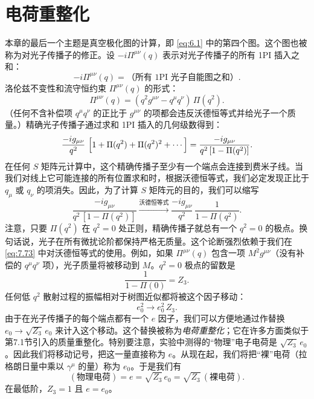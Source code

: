 \section{电荷重整化}

本章的最后一个主题是真空极化图的计算，即 \eqref{eq:6.1} 中的第四个图。这个图也被称为对光子传播子的修正。设 $-i\Pi^{\mu\nu}(q)$ 表示对光子传播子的所有 1PI 插入之和：
\begin{equation}
  -i\Pi^{\mu\nu}(q) = \text{（所有 1PI 光子自能图之和）} .
  \label{eq:7.71}
\end{equation}
洛伦兹不变性和流守恒约束 $\Pi^{\mu\nu}(q)$ 的形式：
\begin{equation}
  \Pi^{\mu\nu}(q) = (q^2g^{\mu\nu} - q^\mu q^\nu)\,\Pi(q^2) .
  \label{eq:7.72}
\end{equation}
（任何不含补偿项 $q^\mu q^\nu$ 的正比于 $g^{\mu\nu}$ 的项都会违反沃德恒等式并给光子一个质量。）精确光子传播子通过求和 1PI 插入的几何级数得到：
\begin{equation}
  \frac{-ig_{\mu\nu}}{q^2}\ \Bigl[ 1 + \Pi(q^2) + \Pi(q^2)^2 + \cdots \Bigr]
  = \frac{-ig_{\mu\nu}}{q^2\,[1 - \Pi(q^2)]} .
  \label{eq:7.73}
\end{equation}
在任何 $S$ 矩阵元计算中，这个精确传播子至少有一个端点会连接到费米子线。当我们对线上它可能连接的所有位置求和时，根据沃德恒等式，我们必定发现正比于 $q_\mu$ 或 $q_\nu$ 的项消失。因此，为了计算 $S$ 矩阵元的目的，我们可以缩写
\begin{equation}
  \frac{-ig_{\mu\nu}}{q^2\,[1-\Pi(q^2)]}
  \xrightarrow{\text{沃德恒等式}}
  \frac{-ig_{\mu\nu}}{q^2}\ \frac{1}{1-\Pi(q^2)} .
  \label{eq:7.75}
\end{equation}
注意，只要 $\Pi(q^2)$ 在 $q^2 = 0$ 处正则，精确传播子就总有一个 $q^2 = 0$ 的极点。换句话说，光子在所有微扰论阶都保持严格无质量。这个论断强烈依赖于我们在 \eqref{eq:7.73} 中对沃德恒等式的使用。例如，如果 $\Pi^{\mu\nu}(q)$ 包含一项 $M^2g^{\mu\nu}$（没有补偿的 $q^\mu q^\nu$ 项），光子质量将被移动到 $M$。$q^2 = 0$ 极点的留数是
\begin{equation}
  \frac{1}{1 - \Pi(0)} = Z_3 .
  \label{eq:7.75b}
\end{equation}
任何低 $q^2$ 散射过程的振幅相对于树图近似都将被这个因子移动：
\begin{equation}
  e_0^2 \to e_0^2\,Z_3 .
\end{equation}
由于在光子传播子的每个端点都有一个 $e$ 因子，我们可以方便地通过作替换 $e_0 \to \sqrt{Z_3}\,e_0$ 来计入这个移动。这个替换被称为\emph{电荷重整化}；它在许多方面类似于第7.1节引入的质量重整化。特别要注意，实验中测得的“物理”电子电荷是 $\sqrt{Z_3}\,e_0$。因此我们将移动记号，把这一量直接称为 $e$。从现在起，我们将把“裸”电荷（拉格朗日量中乘以 $\gamma^\mu$ 的量）称为 $e_0$。于是我们有
\begin{equation}
  (\text{物理电荷}) = e = \sqrt{Z_3}\,e_0 = \sqrt{Z_3}\,
    (\text{裸电荷}) .
  \label{eq:7.76}
\end{equation}
在最低阶，$Z_3 = 1$ 且 $e = e_0$。

